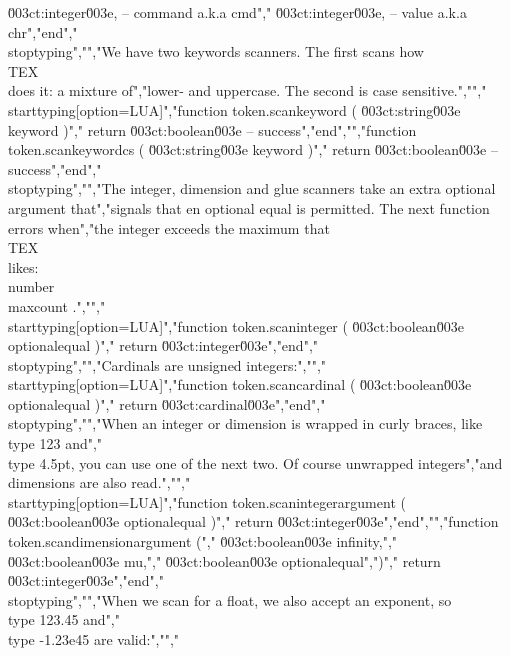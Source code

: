 \u003ct:integer\u003e, -- command a.k.a cmd","        \u003ct:integer\u003e, -- value   a.k.a chr","end","\\stoptyping","","We have two keywords scanners. The first scans how \\TEX\\ does it: a mixture of","lower- and uppercase. The second is case sensitive.","","\\starttyping[option=LUA]","function token.scankeyword ( \u003ct:string\u003e keyword )","    return \u003ct:boolean\u003e -- success","end","","function token.scankeywordcs ( \u003ct:string\u003e keyword )","    return \u003ct:boolean\u003e -- success","end","\\stoptyping","","The integer, dimension and glue scanners take an extra optional argument that","signals that en optional equal is permitted. The next function errors when","the integer exceeds the maximum that \\TEX\\ likes: \\number \\maxcount .","","\\starttyping[option=LUA]","function token.scaninteger ( \u003ct:boolean\u003e optionalequal )","    return \u003ct:integer\u003e","end","\\stoptyping","","Cardinals are unsigned integers:","","\\starttyping[option=LUA]","function token.scancardinal ( \u003ct:boolean\u003e optionalequal )","    return \u003ct:cardinal\u003e","end","\\stoptyping","","When an integer or dimension is wrapped in curly braces, like \\type {{123}} and","\\type {{4.5pt}}, you can use one of the next two. Of course unwrapped integers","and dimensions are also read.","","\\starttyping[option=LUA]","function token.scanintegerargument ( \u003ct:boolean\u003e optionalequal )","    return \u003ct:integer\u003e","end","","function token.scandimensionargument (","    \u003ct:boolean\u003e infinity,","    \u003ct:boolean\u003e mu,","    \u003ct:boolean\u003e optionalequal",")","    return \u003ct:integer\u003e","end","\\stoptyping","","When we scan for a float, we also accept an exponent, so \\type {123.45} and","\\type {-1.23e45} are valid:","","%